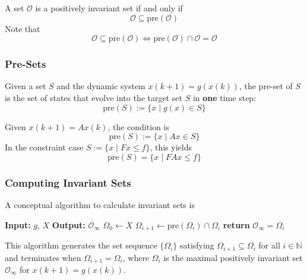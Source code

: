 \newpar{}

A set $\mathcal{O}$ is a positively invariant set if and only if
\begin{equation*}
    \mathcal{O} \subseteq \text{pre}(\mathcal{O})
\end{equation*}
Note that
\begin{equation*}
    \mathcal{O} \subseteq \text{pre}(\mathcal{O}) \iff \text{pre}(\mathcal{O})\cap \mathcal{O} = \mathcal{O}
\end{equation*}
\subsubsection{Pre-Sets}

Given a set $S$ and the dynamic system $x(k + 1) = g(x(k))$, the pre-set of $S$ is the set of states that evolve into the target set $S$ in \textbf{one} time step:
\begin{equation*}
    \text{pre}(S) := \{x \mid g(x) \in S \}
\end{equation*}

\newpar{}

Given $x(k + 1) = A x(k)$, the condition is
\begin{equation*}
    \text{pre}(S) := \{x \mid A x \in S \}
\end{equation*}
In the constraint case $S := \{x \mid F x \leq f \}$, this yields
\begin{equation*}
    \text{pre}(S) = \{x \mid F A x \leq f \}
\end{equation*}

\subsubsection{Computing Invariant Sets}\label{ssec:computing_invariant_sets}
A conceptual algorithm to calculate invariant sets is
\begin{algorithmic}
    \State{} \textbf{Input:} $g$, $X$
    \State{} \textbf{Output:} $\mathcal{O}_\infty$
    \State{} $\Omega_0 \gets X$
    \State{} $\Omega_{i+1} \gets \text{pre}(\Omega_i) \cap \Omega_i$
    \State{} \textbf{return} $\mathcal{O}_\infty = \Omega_i$
    \EndIf{}
    \EndWhile{}
\end{algorithmic}
This algorithm generates the set sequence $\{\Omega_i\}$ satisfying $\Omega_{i+1} \subseteq \Omega_i$ for all $i \in \mathbb{N}$ and terminates when $\Omega_{i+1} = \Omega_i$, where $\Omega_i$ is the maximal positively invariant set $\mathcal{O}_\infty$ for $x(k + 1) = g(x(k))$.

